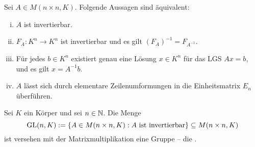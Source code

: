 \setcounter{definition}{18}
\begin{satz}
	\label{satz:I.6.19}
	Sei $A \in M(n \times n,K)$.
	Folgende Aussagen sind äquivalent:
	\begin{enumerate}[(i)]
		\item $A$ ist invertierbar.
		\item $F_A\colon K^n \rightarrow K^n$ ist invertierbar und es gilt $(F_A)^{-1} = F_{A^{-1}}$.
		\item Für jedes $b \in K^n$ existiert genau eine Lösung $x \in K^n$ für das LGS $Ax = b$, und es gilt $x = A^{-1}b$.
		\item $A$ lässt sich durch elementare Zeilenumformungen in die Einheitsmatrix $E_n$ überführen.
	\end{enumerate}
\end{satz}

\setcounter{definition}{21}
\begin{definition}
	\label{def:I.6.22}
	Sei $K$ ein Körper und sei $n \in \mathbb{N}$.
	Die Menge
	\[
		\operatorname{GL}(n,K) := \{A \in M(n\times n,K) : A \text{ ist invertierbar}\} \subseteq M(n\times n,K)
	\]
	ist versehen mit der Matrixmultiplikation eine Gruppe -- die .
\end{definition}
\newpage